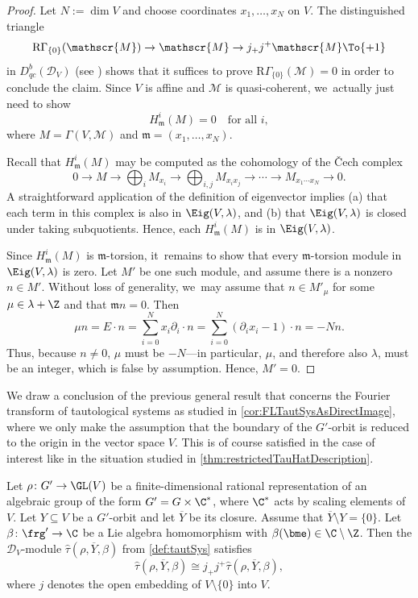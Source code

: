 \begin{proof}
Let $N := \dim V$ and choose coordinates $x_1,\dots,x_N$ on $V$. The distinguished triangle
\[
\mathrm{R}\Gamma_{\{0\}}(\mathscr{M}) \to \mathscr{M} \to j_+j^+\mathscr{M} \To{+1}
\]
in $D_{qc}^b(\mathscr D_V)$ (see \cite[Prop.\,1.7.1(i)]{Hotta}) shows that it suffices to prove $\mathrm{R}\Gamma_{\{0\}}(\mathscr{M}) = 0$ in order to conclude the claim. Since $V$ is affine and $\mathscr{M}$ is quasi-coherent, we~actually just need to show
\[
H^i_{\mathfrak{m}}(M)=0\quad\text{for all }i,
\]
where $M=\Gamma(V, \mathscr{M})$ and $\mathfrak{m}=(x_1,\ldots,x_N)$.

Recall that $H^i_\mathfrak{m}(M)$ may be computed as the cohomology of the \v{C}ech complex
\[
0 \to M \to \bigoplus_{i} M_{x_i} \to \bigoplus_{i,j} M_{x_ix_j} \to \cdots \to M_{x_1\cdots x_N}\to 0.
\]
A straightforward application of the definition of eigenvector implies (a) that each term in this complex is also in $\Eig(V,\lambda)$, and (b) that $\Eig(V,\lambda)$ is closed under taking subquotients. Hence, each $H^i_\mathfrak{m}(M)$ is in $\Eig(V,\lambda)$.

Since $H^i_\mathfrak{m}(M)$ is $\mathfrak{m}$-torsion, it~remains to show that every $\mathfrak{m}$-torsion module in $\Eig(V,\lambda)$ is zero. Let $M'$ be one such module, and assume there is a nonzero $n\in M'$. Without loss of generality, we~may assume that $n\in M'_\mu$ for some $\mu\in \lambda +\Z$ and that $\mathfrak{m}n=0$. Then
\[
\mu n = E\cdot n
= \sum_{i=0}^N x_i\partial_i \cdot n
= \sum_{i=0}^N (\partial_i x_i -1) \cdot n = -N n.
\]
Thus, because $n\neq 0$, $\mu$ must be $-N$---in particular, $\mu$, and therefore also $\lambda$, must be an integer, which is false by assumption. Hence, $M'=0$.
\end{proof}
We draw a conclusion of the previous general result that concerns the Fourier transform of tautological systems as studied in \cref{cor:FLTautSysAsDirectImage}, where we only make the assumption that the boundary of the $G'$-orbit is reduced to the origin in the vector space $V$. This is of course satisfied in the case of interest like in the situation studied in \cref{thm:restrictedTauHatDescription}.

\begin{cor} \label{cor:localization}
Let $\rho \colon G' \to \GL(V)$ be a finite-dimensional rational representation of an algebraic group of the form $G' = G \times \C^*$, where $\C^*$ acts by scaling elements of~$V$. Let $Y \subseteq V$ be a $G'$-orbit and let $\overline{Y}$ be its closure. Assume that $\overline{Y}\setminus Y = \{0\}$.
Let $\beta \colon \frg' \to \C$ be a Lie algebra homomorphism with $\beta(\bme) \in \C \setminus \Z$. Then the $\mathscr{D}_V$\nobreakdash-mod\-ule $\hat\tau(\rho,\overline{Y},\beta)$ from \cref{def:tautSys} satisfies
\[
\hat\tau(\rho,\overline{Y},\beta) \cong j_+ j^+\hat \tau(\rho,\overline{Y},\beta),
\]
where $j$ denotes the open embedding of $V \setminus \{0\}$ into $V$.
\end{cor}


